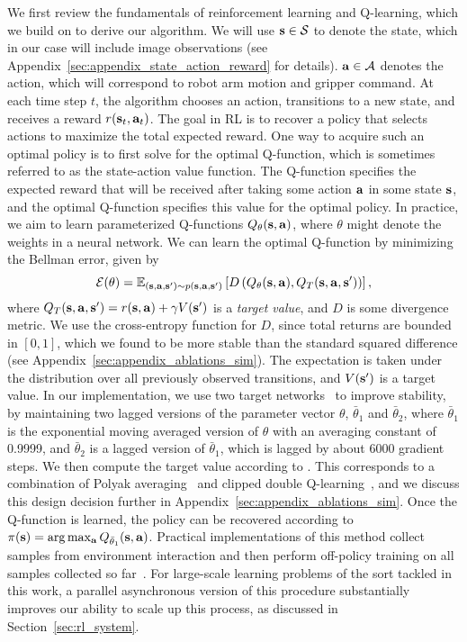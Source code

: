\documentclass{article}
\begin{document}
We first review the fundamentals of reinforcement learning and Q-learning, which we build on to derive our algorithm. We will use $\mathbf{s} \in \mathcal{S}$ to denote the state, which in our case will include image observations (see Appendix~\ref{sec:appendix_state_action_reward} for details). $\mathbf{a} \in \mathcal{A}$ denotes the action, which will correspond to robot arm motion and gripper command. At each time step $t$, the algorithm chooses an action, transitions to a new state, and receives a reward $r(\mathbf{s}_t,\mathbf{a}_t)$. The goal in RL is to recover a policy that selects actions to maximize the total expected reward. One way to acquire such an optimal policy is to first solve for the optimal Q-function, which is sometimes referred to as the state-action value function. The Q-function specifies the expected reward that will be received after taking some action $\mathbf{a}$ in some state $\mathbf{s}$, and the optimal Q-function specifies this value for the optimal policy. In practice, we aim to learn parameterized Q-functions $Q_\theta(\mathbf{s},\mathbf{a})$, where $\theta$ might denote the weights in a neural network. We can learn the optimal Q-function by minimizing the Bellman error, given by
\begin{equation}
\literallabel{eq:bellman}{
\bellman(\theta) = \E_{(\bs,\ba,\bs') \sim p(\bs,\ba,\bs')} \left[ D \left(
Q_\theta(\bs,\ba) ,Q_T(\bs,\ba,\bs') \right)
\right],}
\end{equation}
where $Q_T(\mathbf{s},\mathbf{a},\mathbf{s}') = r(\mathbf{s},\mathbf{a}) + \gamma V(\mathbf{s}')$ is a \emph{target value}, and $D$ is some divergence metric. We use the cross-entropy function for $D$, since total returns are bounded in $[0,1]$, which we found to be more stable than the standard squared difference (see Appendix~\ref{sec:appendix_ablations_sim}). The expectation is taken under the distribution over all previously observed transitions, and $V(\mathbf{s}')$ is a target value. In our implementation, we use two target networks~\citep{hafner11,mnih2015,gu16} to improve stability, by maintaining two lagged versions of the parameter vector $\theta$, $\bar{\theta}_1$ and $\bar{\theta}_2$, where $\bar{\theta}_1$ is the exponential moving averaged version of $\theta$ with an averaging constant of 0.9999, and $\bar{\theta}_2$ is a lagged version of $\bar{\theta}_1$, which is lagged by about 6000 gradient steps. We then compute the target value according to . This corresponds to a combination of Polyak averaging~\citep{polyak1992acceleration,lhph-ccdrl-16} and clipped double Q-learning~\citep{hasselt10,hasselt16,td3}, and we discuss this design decision further in Appendix~\ref{sec:appendix_ablations_sim}. Once the Q-function is learned, the policy can be recovered according to $\pi(\mathbf{s}) = \arg\max_{\mathbf{a}} Q_{\bar{\theta}_1} (\mathbf{s},\mathbf{a})$. Practical implementations of this method collect samples from environment interaction and then perform off-policy training on all samples collected so far~\citep{hafner11,mnih2015,gu16}. For large-scale learning problems of the sort tackled in this work, a parallel asynchronous version of this procedure substantially improves our ability to scale up this process, as discussed in Section~\ref{sec:rl_system}.
\end{document}
